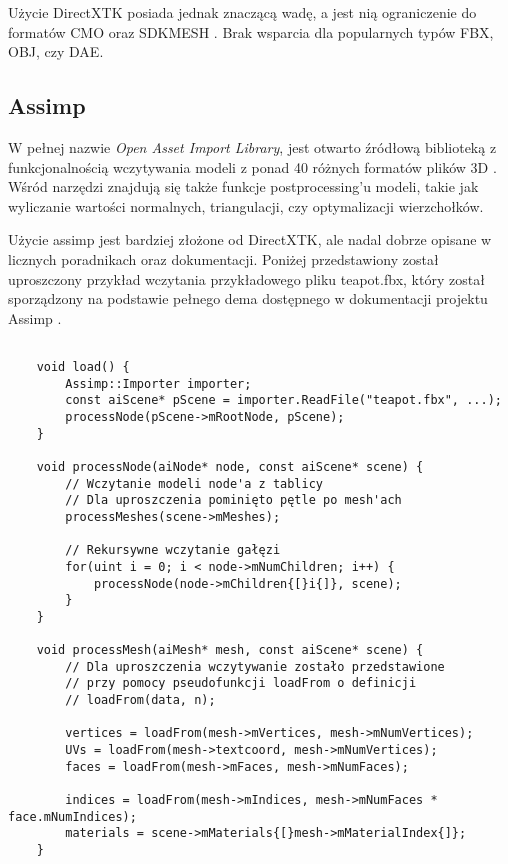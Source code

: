 Użycie DirectXTK posiada jednak znaczącą wadę, a jest nią ograniczenie
do formatów CMO oraz SDKMESH \cite{github:directxtk:model:2024}. Brak wsparcia dla popularnych
typów FBX, OBJ, czy DAE.

\subsection{Assimp}

W pełnej nazwie \emph{Open Asset Import Library}, jest otwarto źródłową
biblioteką z funkcjonalnością wczytywania modeli z ponad 40 różnych
formatów plików 3D \cite{github:assimp:2024}. Wśród narzędzi znajdują się także funkcje
postprocessing'u modeli, takie jak wyliczanie wartości normalnych,
triangulacji, czy optymalizacji wierzchołków.

Użycie assimp jest bardziej złożone od DirectXTK, ale nadal dobrze
opisane w licznych poradnikach oraz dokumentacji. Poniżej przedstawiony
został uproszczony przykład wczytania przykładowego pliku teapot.fbx,
który został sporządzony na podstawie pełnego dema dostępnego w
dokumentacji projektu Assimp \cite{github:assimp:dx11sample:2024}.

\begin{lstlisting}[caption={Przykład użycia Assimp (oryginalna treść)}, label={lst:assimp_load}]

	void load() {
		Assimp::Importer importer;
		const aiScene* pScene = importer.ReadFile("teapot.fbx", ...);
		processNode(pScene->mRootNode, pScene);
	}
	
	void processNode(aiNode* node, const aiScene* scene) {
		// Wczytanie modeli node'a z tablicy
		// Dla uproszczenia pominięto pętle po mesh'ach
		processMeshes(scene->mMeshes);
		
		// Rekursywne wczytanie gałęzi
		for(uint i = 0; i < node->mNumChildren; i++) {
			processNode(node->mChildren{[}i{]}, scene);		
		}
	}
	
	void processMesh(aiMesh* mesh, const aiScene* scene) {		
		// Dla uproszczenia wczytywanie zostało przedstawione
		// przy pomocy pseudofunkcji loadFrom o definicji
		// loadFrom(data, n);
		
		vertices = loadFrom(mesh->mVertices, mesh->mNumVertices);
		UVs = loadFrom(mesh->textcoord, mesh->mNumVertices);
		faces = loadFrom(mesh->mFaces, mesh->mNumFaces);
		
		indices = loadFrom(mesh->mIndices, mesh->mNumFaces * face.mNumIndices);
		materials = scene->mMaterials{[}mesh->mMaterialIndex{]};
	}
	
\end{lstlisting}

